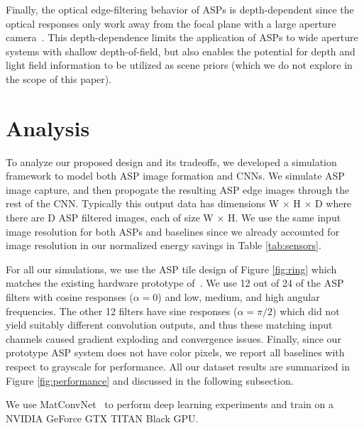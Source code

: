 \documentclass[10pt,twocolumn,letterpaper]{article}
\newcommand{\Section}[1]{\vspace{-4pt}\section{#1}\vspace{-4pt}}
\begin{document}
Finally, the optical edge-filtering behavior of ASPs is depth-dependent since the optical responses only work away from the focal plane with a large aperture camera~\cite{wang2012light}. This depth-dependence limits the application of ASPs to wide aperture systems with shallow depth-of-field, but also enables the potential for depth and light field information to be utilized as scene priors (which we do not explore in the scope of this paper).











\Section{Analysis}
	To analyze our proposed design and its tradeoffs, we developed a simulation framework to model both ASP image formation and CNNs. We simulate ASP image capture, and then propogate the resulting ASP edge images through the rest of the CNN. Typically this output data has dimensions W $\times$ H $\times$ D where there are D ASP filtered images, each of size W $\times$ H. We use the same input image resolution for both ASPs and baselines since we already accounted for image resolution in our normalized energy savings in Table \ref{tab:sensors}.

For all our simulations, we use the ASP tile design of Figure \ref{fig:ring} which matches the existing hardware prototype of~\cite{wang2012compression}.  We use 12 out of 24 of the ASP filters with cosine responses ($\alpha = 0$) and low, medium, and high angular frequencies. The other 12 filters have sine responses ($\alpha = \pi/2$) which did not yield suitably different convolution outputs, and thus these matching input channels caused gradient exploding and convergence issues. Finally, since our prototype ASP system does not have color pixels, we report all baselines with respect to grayscale for performance. All our dataset results are summarized in Figure \ref{fig:performance} and discussed in the following subsection.

 We use MatConvNet~\cite{vedaldi15matconvnet} to perform deep learning experiments and train on a NVIDIA GeForce GTX TITAN Black GPU. 
\end{document}
